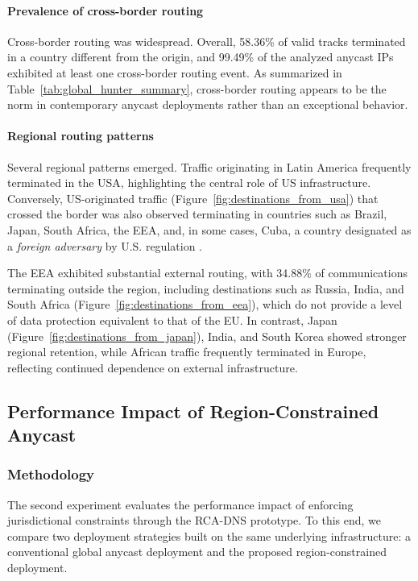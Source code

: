 \documentclass[acmsmall]{acmart}
\begin{document}
\paragraph{Prevalence of cross-border routing}

Cross-border routing was widespread. Overall, 58.36\% of valid tracks terminated in a country different from the origin, and 99.49\% of the analyzed anycast IPs exhibited at least one cross-border routing event. As summarized in Table~\ref{tab:global_hunter_summary}, cross-border routing appears to be the norm in contemporary anycast deployments rather than an exceptional behavior.

\paragraph{Regional routing patterns}

Several regional patterns emerged. Traffic originating in Latin America frequently terminated in the USA, highlighting the central role of US infrastructure. Conversely, US-originated traffic (Figure~\ref{fig:destinations_from_usa}) that crossed the border was also observed terminating in countries such as Brazil, Japan, South Africa, the EEA, and, in some cases, Cuba, a country designated as a \textit{foreign adversary} by U.S. regulation \cite{ECFRAdversaries.}.

The EEA exhibited substantial external routing, with 34.88\% of communications terminating outside the region, including destinations such as Russia, India, and South Africa (Figure~\ref{fig:destinations_from_eea}), which do not provide a level of data protection equivalent to that of the EU. In contrast, Japan (Figure~\ref{fig:destinations_from_japan}), India, and South Korea showed stronger regional retention, while African traffic frequently terminated in Europe, reflecting continued dependence on external infrastructure.

\subsection{Performance Impact of Region-Constrained Anycast}

\subsubsection{Methodology}\label{sss:Methodology}

The second experiment evaluates the performance impact of enforcing jurisdictional constraints through the RCA-DNS prototype. To this end, we compare two deployment strategies built on the same underlying infrastructure: a conventional global anycast deployment and the proposed region-constrained deployment.
\end{document}
